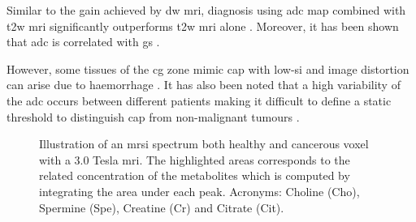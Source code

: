 Similar to the gain achieved by \ac{dw} \ac{mri}, diagnosis using \ac{adc} map combined with \ac{t2w} \ac{mri} significantly outperforms \ac{t2w} \ac{mri} alone \cite{Doo2012,Choi2007}.
Moreover, it has been shown that \ac{adc} is correlated with \ac{gs} \cite{Hambrock2011, Itou2011, Peng2013}.

However, some tissues of the \ac{cg} zone mimic \ac{cap} with low-\ac{si} \cite{Kirkham2006} and image distortion can arise due to haemorrhage \cite{Choi2007}.
It has also been noted that a high variability of the \ac{adc} occurs between different patients making it difficult to define a static threshold to distinguish \ac{cap} from non-malignant tumours \cite{Choi2007}. 

\begin{figure}
	\centering
	\hspace*{\fill}
	 \hfill
	\hspace*{\fill}
	\caption[Illustration of healthy and cancerous \ac{mrsi} spectrum.]{Illustration of an \ac{mrsi} spectrum both healthy and cancerous voxel with a 3.0 Tesla \ac{mri}. The highlighted areas corresponds to the related concentration of the metabolites which is computed by integrating the area under each peak. Acronyms: Choline (Cho), Spermine (Spe), Creatine (Cr) and Citrate (Cit).}
	\label{fig:mrsi}
\end{figure}


